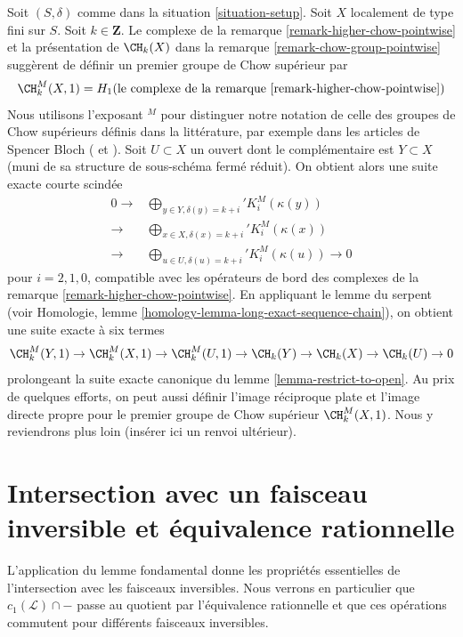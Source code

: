\begin{remark}
\label{remark-higher-chow}
Soit $(S, \delta)$ comme dans la situation \ref{situation-setup}.
Soit $X$ localement de type fini sur $S$. Soit $k \in \mathbf{Z}$.
Le complexe de la remarque \ref{remark-higher-chow-pointwise} et la
présentation de $\CH_k(X)$ dans la remarque \ref{remark-chow-group-pointwise}
suggèrent de définir un premier groupe de Chow supérieur par
$$
\CH^M_k(X, 1) =
H_1(\text{le complexe de la remarque \ref{remark-higher-chow-pointwise}})
$$
Nous utilisons l'exposant ${}^M$ pour distinguer notre notation de celle des
groupes de Chow supérieurs définis dans la littérature, par exemple dans les articles
de Spencer Bloch (\cite{Bloch} et \cite{Bloch-moving}).
Soit $U \subset X$ un ouvert dont le complémentaire est $Y \subset X$ (muni de sa structure de
sous-schéma fermé réduit). On obtient alors une suite exacte courte scindée
$$
\begin{aligned}
0 \to{}&
\bigoplus\nolimits_{y \in Y, \delta(y) = k + i}' K_i^M(\kappa(y)) \\
{}\to{}&
\bigoplus\nolimits_{x \in X, \delta(x) = k + i}' K_i^M(\kappa(x)) \\
{}\to{}&
\bigoplus\nolimits_{u \in U, \delta(u) = k + i}' K_i^M(\kappa(u)) \to 0
\end{aligned}
$$
pour $i = 2, 1, 0$, compatible avec les opérateurs de bord des complexes
de la remarque \ref{remark-higher-chow-pointwise}. En appliquant le lemme du serpent
(voir Homologie, lemme \ref{homology-lemma-long-exact-sequence-chain}),
on obtient une suite exacte à six termes
$$
\CH^M_k(Y, 1) \to \CH^M_k(X, 1) \to \CH^M_k(U, 1) \to
\CH_k(Y) \to \CH_k(X) \to \CH_k(U) \to 0
$$
prolongeant la suite exacte canonique du lemme \ref{lemma-restrict-to-open}.
Au prix de quelques efforts, on peut aussi définir l'image réciproque plate et l'image directe propre
pour le premier groupe de Chow supérieur $\CH^M_k(X, 1)$. Nous y reviendrons
plus loin (insérer ici un renvoi ultérieur).
\end{remark}






\section{Intersection avec un faisceau inversible et équivalence rationnelle}
\label{section-commutativity}

\noindent
L'application du lemme fondamental donne les propriétés essentielles de l'intersection
avec les faisceaux inversibles. Nous verrons en particulier que
$c_1(\mathcal{L}) \cap -$ passe au quotient par l'équivalence rationnelle et
que ces opérations commutent pour différents faisceaux inversibles.

